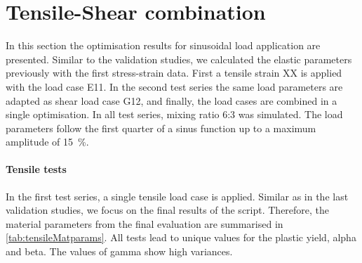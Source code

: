 



\section{Tensile-Shear combination}
In this section the optimisation results for sinusoidal load application are presented. Similar to the validation studies, we calculated the elastic parameters previously with the first stress-strain data. First a tensile strain  XX is applied with the load case E11. In the second test series the same load parameters are adapted as shear load case G12, and finally, the load cases are combined in a single optimisation. In all test series, mixing ratio 6:3 was simulated. The load parameters follow the first quarter of a sinus function up to a maximum amplitude of 15 \%. 

\paragraph{Tensile tests}
In the first test series, a single tensile load case is applied. Similar as in the last validation studies, we focus on the final results of the script. Therefore, the material parameters from the final evaluation are summarised in \autoref{tab:tensileMatparams}. All tests lead to unique values for the plastic yield, alpha and beta. The values of gamma show high variances. 

